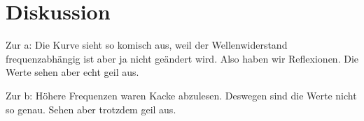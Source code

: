 \section{Diskussion}
\label{sec:Diskussion}

Zur a:
Die Kurve sieht so komisch aus, weil der Wellenwiderstand frequenzabhängig ist aber ja nicht geändert wird. Also haben wir Reflexionen.
Die Werte sehen aber echt geil aus.

Zur b:
Höhere Frequenzen waren Kacke abzulesen. Deswegen sind die Werte nicht so genau.
Sehen aber trotzdem geil aus.
